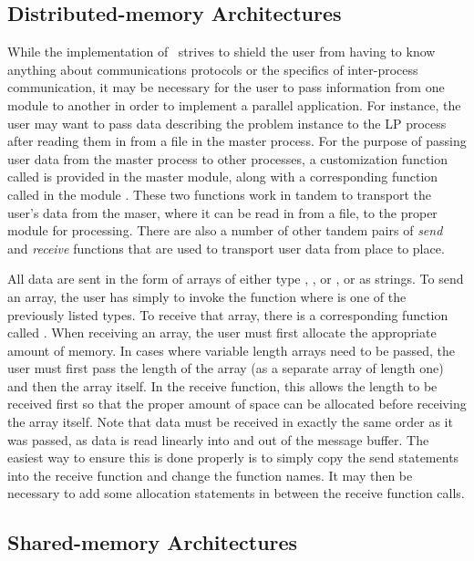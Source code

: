 \subsection{Distributed-memory Architectures}
\label{communication}

While the implementation of \BB\ strives to shield the user from having to
know anything about communications protocols or the specifics of inter-process
communication, it may be necessary for the user to pass information from one
module to another in order to implement a parallel application. For instance,
the user may want to pass data describing the problem instance to the LP
process after reading them in from a file in the master process. For the
purpose of passing user data from the master process to other processes, a
customization function called
 is provided in the master module, along with a
corresponding function called  in the module
\code{*}. These two functions work in tandem to transport the user's data
from the maser, where it can be read in from a file, to the proper module for
processing. There are also a number of other tandem pairs of \emph{send} and
\emph{receive} functions that are used to transport user data from place to
place.

All data are sent in the form of arrays of either type , ,
or , or as strings. To send an array, the user has simply to
invoke the function  where
 is one of the previously listed types. To receive that array,
there is a corresponding function called . When receiving an array, the user must first allocate the
appropriate amount of memory. In cases where variable length arrays need to be
passed, the user must first pass the length of the array (as a separate array
of length one) and then the array itself. In the receive function, this allows
the length to be received first so that the proper amount of space can be
allocated before receiving the array itself. Note that data must be received
in exactly the same order as it was passed, as data is read linearly into and
out of the message buffer. The easiest way to ensure this is done properly is
to simply copy the send statements into the receive function and change the
function names. It may then be necessary to add some allocation statements in
between the receive function calls.

\subsection{Shared-memory Architectures}
\label{shared}

